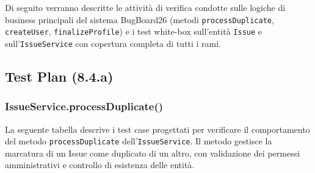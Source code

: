 ﻿\documentclass[11pt,a4paper]{article}
\begin{document}
Di seguito verranno descritte le attività di verifica condotte sulle logiche di business principali del sistema BugBoard26 (metodi \texttt{processDuplicate}, \texttt{createUser}, \texttt{finalizeProfile}) e i test white-box sull'entità \texttt{Issue} e sull'\texttt{IssueService} con copertura completa di tutti i rami.

\subsection{Test Plan (8.4.a)}

\subsubsection{IssueService.processDuplicate()}

La seguente tabella descrive i test case progettati per verificare il comportamento del metodo \texttt{processDuplicate} dell'\texttt{IssueService}. Il metodo gestisce la marcatura di un Issue come duplicato di un altro, con validazione dei permessi amministrativi e controllo di esistenza delle entità.\\
\end{document}
